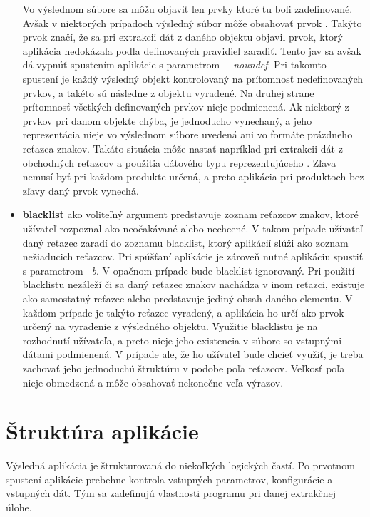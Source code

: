 \begin{itemize}
  Vo výslednom súbore sa môžu objaviť len prvky ktoré tu boli zadefinované. Avšak v niektorých prípadoch výsledný súbor môže obsahovať prvok . Takýto prvok značí, že sa pri extrakcii dát z daného objektu objavil prvok, ktorý aplikácia nedokázala podľa definovaných pravidiel zaradiť. Tento jav sa avšak dá vypnúť spustením aplikácie s parametrom \textit{\texttt{-{}-}noundef}. Pri takomto spustení je každý výsledný objekt kontrolovaný na prítomnosť nedefinovaných prvkov, a takéto sú následne z objektu vyradené. Na druhej strane prítomnosť všetkých definovaných prvkov nieje podmienená. Ak niektorý z prvkov pri danom objekte chýba, je jednoducho vynechaný, a jeho reprezentácia nieje vo výslednom súbore uvedená ani vo formáte prázdneho reťazca znakov. Takáto situácia môže nastať napríklad pri extrakcii dát z obchodných reťazcov a použitia dátového typu reprezentujúceho . Zľava nemusí byť pri každom produkte určená, a preto aplikácia pri produktoch bez zľavy daný prvok vynechá.
  
  \item \textbf{blacklist} ako voliteľný argument predstavuje zoznam reťazcov znakov, ktoré užívateľ rozpoznal ako neočakávané alebo nechcené. V takom prípade užívateľ daný reťazec zaradí do zoznamu blacklist, ktorý aplikácií slúži ako zoznam nežiaducich reťazcov. Pri spúšťaní aplikácie je zároveň nutné aplikáciu spustiť s parametrom \textit{\texttt{-}b}. V opačnom prípade bude blacklist ignorovaný. Pri použití blacklistu nezáleží či sa daný reťazec znakov nachádza v inom reťazci, existuje ako samostatný reťazec alebo predstavuje jediný obsah daného elementu. V každom prípade je takýto reťazec vyradený, a aplikácia ho určí ako prvok určený na vyradenie z výsledného objektu. Využitie blacklistu je na rozhodnutí užívateľa, a preto nieje jeho existencia v súbore so vstupnými dátami podmienená. V prípade ale, že ho užívateľ bude chcieť využiť, je treba zachovať jeho jednoduchú štruktúru v podobe poľa reťazcov. Veľkosť poľa nieje obmedzená a môže obsahovať nekonečne veľa výrazov. 
 \end{itemize}
 
 \section{Štruktúra aplikácie}
 
 Výsledná aplikácia je štrukturovaná do niekoľkých logických častí. Po prvotnom spustení aplikácie prebehne kontrola vstupných parametrov, konfigurácie a vstupných dát. Tým sa zadefinujú vlastnosti programu pri danej extrakčnej úlohe.
 
